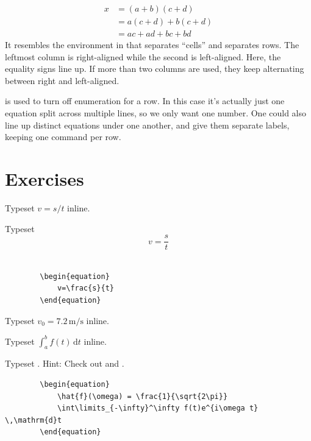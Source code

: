 {\begin{align}
	x   &= (a+b)(c+d)		\nonumber \\
		&= a(c+d)+b(c+d)		\nonumber \\
		&= ac+ad+bc+bd
\end{align}
It resembles the  environment in that \latexin{&} separates ``cells'' and \latexin{\\} separates rows. The leftmost column is right-aligned while the second is left-aligned. Here, the equality signs line up. If more than two columns are used, they keep alternating between right and left-aligned.

\latexin{\nonumber} is used to turn off enumeration for a row. In this case it's actually just one equation split across multiple lines, so we only want one number. One could also line up distinct equations under one another, and give them separate labels, keeping one \latexin{\label} command per row.

\section{Exercises}
\begin{ExerciseList}
	\Exercise Typeset $v=s/t$ inline.
	\Answer ~\\ 
	
	\Exercise Typeset
		\begin{equation}
			v=\frac{s}{t}
		\end{equation}
	\Answer ~\\
	\begin{verbatim}
		\begin{equation}
			v=\frac{s}{t}
		\end{equation}
	\end{verbatim}

	\Exercise Typeset $v_0 = 7.2 \, \mathrm{m/s}$ inline.
	\Answer ~\\ 
	
	\Exercise Typeset $\int_a^b f(t) \, \mathrm{d}t$ inline.
	\Answer ~\\ 
	
	\Exercise Typeset . Hint: Check out \latexin{\hat} and \latexin{\infty}.
	\Answer ~\\
	\begin{verbatim}
		\begin{equation}
			\hat{f}(\omega) = \frac{1}{\sqrt{2\pi}}
			\int\limits_{-\infty}^\infty f(t)e^{i\omega t} \,\mathrm{d}t
		\end{equation}
	\end{verbatim}	
	

\end{ExerciseList}}
